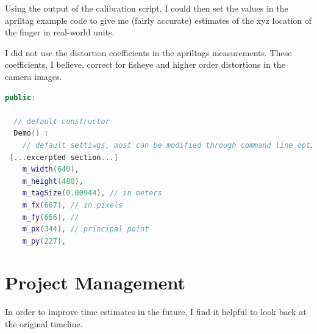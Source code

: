 \documentclass[preprint,12pt,3p]{elsarticle}
\begin{document}
Using the output of the calibration script, I could then set the values in the apriltag example code
to give me (fairly accurate) estimates of the xyz location of the finger in real-world units.


I did not use the distortion coefficients in the apriltags measurements. These
coefficients, I believe, correct for fisheye and higher order distortions in the
camera images.

\begin{lstlisting}[language=C++,breaklines]
public:

  // default constructor
  Demo() :
    // default settiwgs, most can be modified through command line options (see below)
 [...excerpted section...]
    m_width(640),
    m_height(480),
    m_tagSize(0.00944), // in meters
    m_fx(667), // in pixels
    m_fy(666), //
    m_px(344), // principal point
    m_py(227),
\end{lstlisting}


\newpage

\section{Project Management}

In order to improve time estimates in the future, I find it helpful to look back
at the original timeline. 
\end{document}
